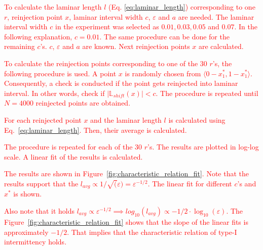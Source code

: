 \par
\textcolor{red}{
To calculate the laminar length $l$ (Eq. \ref{eq:laminar_length}) corresponding to one $r$, reinjection point $x$, laminar interval width $c$, $\varepsilon$ and $a$ are needed.
The laminar interval width $c$ in the experiment was selected as $0.01, 0.03, 0.05$ and $0.07$.
In the following explanation, $c = 0.01$.
The same procedure can be done for the remaining $c$'s.
$c$, $\varepsilon$ and $a$ are known.
Next reinjection points $x$ are calculated.
}
\par
\textcolor{red}{
To calculate the reinjection points corresponding to one of the $30$ $r$'s, the following procedure is used.
A point $x$ is randomly chosen from $\langle 0-x^{*}_{1}, 1-x^{*}_{1} \rangle$.
Consequently, a check is conducted if the point gets reinjected into laminar interval.
In other words, check if $| \mathbb{L}_{shift}(x) | < c$.
The procedure is repeated until $N = 4000$ reinjected points are obtained.
}
\par
\textcolor{red}{
For each reinjected point $x$ and the laminar length $l$ is calculated using Eq.~\ref{eq:laminar_length}.
Then, their average is calculated.
}
\par
\textcolor{red}{
The procedure is repeated for each of the $30$ $r$'s.
The results are plotted in log-log scale.
A linear fit of the results is calculated.
}
\par
\textcolor{red}{
The results are shown in Figure~\ref{fig:characteristic_relation_fit}.
Note that the results support that the $l_{avg} \propto 1/\sqrt(\varepsilon) = \varepsilon ^ {-1/2}$.
The linear fit for different $c$'s and $x^{*}$ is shown.
}
\par
\textcolor{red}{
Also note that it holds $l_{avg} \propto \varepsilon ^ {-1/2} \implies log_{10}(l_{avg}) \propto -1/2 \cdot \log_{10}(\varepsilon)$.
The Figure~\ref{fig:characteristic_relation_fit} shows that the slope of the linear fits is approximately $-1/2$.
That implies that the characteristic relation of type-I intermittency holds. 
}

